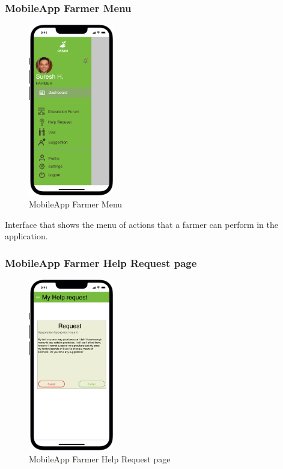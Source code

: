 \subsubsection{MobileApp Farmer Menu}

\begin{figure}[H]
  \centering
    \vspace*{-0.3cm}
     \includegraphics[width=37mm,scale=0.9]{./Images//Mocks/Mobile/Farmer_menu.png}
     \vspace*{-0.3cm}
     \caption{MobileApp Farmer Menu}
\end{figure}

Interface that shows the menu of actions that a farmer can perform in the application.\\

\subsubsection{MobileApp Farmer Help Request page}

\begin{figure}[H]
  \centering
    \vspace*{-0.3cm}
     \includegraphics[width=37mm,scale=0.9]{./Images//Mocks/Mobile/Farmer_help_req.png}
     \vspace*{-0.3cm}
     \caption{MobileApp Farmer Help Request page}
\end{figure}

